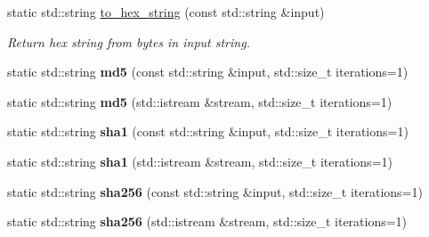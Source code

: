\begin{DoxyCompactItemize}
\item 
static std\+::string \hyperlink{classSimpleWeb_1_1Crypto_ab40abff25234f08b7b90fc97fab39faa}{to\+\_\+hex\+\_\+string} (const std\+::string \&input)\hypertarget{classSimpleWeb_1_1Crypto_ab40abff25234f08b7b90fc97fab39faa}{}\label{classSimpleWeb_1_1Crypto_ab40abff25234f08b7b90fc97fab39faa}

\begin{DoxyCompactList}\small\item\em Return hex string from bytes in input string. \end{DoxyCompactList}\item 
static std\+::string {\bfseries md5} (const std\+::string \&input, std\+::size\+\_\+t iterations=1)\hypertarget{classSimpleWeb_1_1Crypto_a433f110107285131f8b9bb30ccb68113}{}\label{classSimpleWeb_1_1Crypto_a433f110107285131f8b9bb30ccb68113}

\item 
static std\+::string {\bfseries md5} (std\+::istream \&stream, std\+::size\+\_\+t iterations=1)\hypertarget{classSimpleWeb_1_1Crypto_ae3f7c1e1c5e7d241330042a7b2224698}{}\label{classSimpleWeb_1_1Crypto_ae3f7c1e1c5e7d241330042a7b2224698}

\item 
static std\+::string {\bfseries sha1} (const std\+::string \&input, std\+::size\+\_\+t iterations=1)\hypertarget{classSimpleWeb_1_1Crypto_afeda29c9bc7a1767f33c9fb035035296}{}\label{classSimpleWeb_1_1Crypto_afeda29c9bc7a1767f33c9fb035035296}

\item 
static std\+::string {\bfseries sha1} (std\+::istream \&stream, std\+::size\+\_\+t iterations=1)\hypertarget{classSimpleWeb_1_1Crypto_ae1a877a0deff2ab9cf889bc7f25b354e}{}\label{classSimpleWeb_1_1Crypto_ae1a877a0deff2ab9cf889bc7f25b354e}

\item 
static std\+::string {\bfseries sha256} (const std\+::string \&input, std\+::size\+\_\+t iterations=1)\hypertarget{classSimpleWeb_1_1Crypto_a85dab539a1acbf8d5fdf5edf53fc2e60}{}\label{classSimpleWeb_1_1Crypto_a85dab539a1acbf8d5fdf5edf53fc2e60}

\item 
static std\+::string {\bfseries sha256} (std\+::istream \&stream, std\+::size\+\_\+t iterations=1)\hypertarget{classSimpleWeb_1_1Crypto_ae8e775210fe6c4f0c16446365cde37b0}{}\label{classSimpleWeb_1_1Crypto_ae8e775210fe6c4f0c16446365cde37b0}


\end{DoxyCompactItemize}
